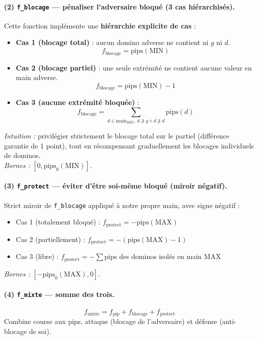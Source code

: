 \documentclass[11pt,a4paper]{article}
\begin{document}
\paragraph{(2) \texttt{f\_blocage} --- pénaliser l'adversaire bloqué (3 cas hiérarchisés).}
Cette fonction implémente une \textbf{hiérarchie explicite de cas} :
\begin{itemize}[leftmargin=*]
    \item \textbf{Cas 1 (blocage total)} : aucun domino adverse ne contient ni $g$ ni $d$.
          \[ f_{\text{blocage}} = \text{pips}(\text{MIN}) \]
    \item \textbf{Cas 2 (blocage partiel)} : une seule extrémité ne contient aucune valeur en main adverse.
          \[ f_{\text{blocage}} = \text{pips}(\text{MIN}) - 1 \]
    \item \textbf{Cas 3 (aucune extrémité bloquée)} :
          \[ f_{\text{blocage}} = \sum_{d \in \text{main}_{\text{MIN}},\ d \not\ni g \wedge d \not\ni d}\!\!\!\!\!\! \text{pips}(d) \]
\end{itemize}
\textit{Intuition :} privilégier strictement le blocage total sur le partiel
(différence garantie de 1 point), tout en récompensant graduellement les blocages
individuels de dominos.\\
\textit{Bornes :} $\left[0, \text{pips}_0(\text{MIN})\right]$.

\paragraph{(3) \texttt{f\_protect} --- éviter d'être soi-même bloqué (miroir négatif).}
Strict miroir de \texttt{f\_blocage} appliqué à notre propre main, avec signe négatif :
\begin{itemize}[leftmargin=*]
    \item Cas 1 (totalement bloqué) : $f_{\text{protect}} = -\text{pips}(\text{MAX})$
    \item Cas 2 (partiellement) : $f_{\text{protect}} = -(\text{pips}(\text{MAX}) - 1)$
    \item Cas 3 (libre) : $f_{\text{protect}} = -\!\!\sum \text{pips}$ des dominos isolés en main MAX
\end{itemize}
\textit{Bornes :} $\left[-\text{pips}_0(\text{MAX}), 0\right]$.

\paragraph{(4) \texttt{f\_mixte} --- somme des trois.}
\[
    f_{\text{mixte}} = f_{\text{pip}} + f_{\text{blocage}} + f_{\text{protect}}
\]
Combine course aux pips, attaque (blocage de l'adversaire) et défense (anti-blocage de soi).
\end{document}
